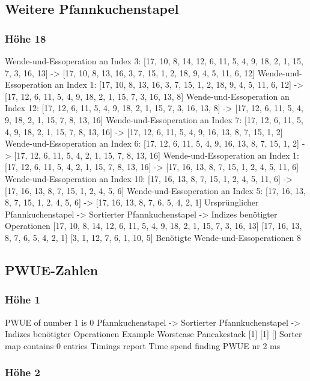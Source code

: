 {    \subsection{Weitere Pfannkuchenstapel}\label{sec:weitere-Pfannkuchenstapel}
    \subsubsection{Höhe 18}

    Wende-und-Essoperation an Index 3: [17, 10, 8, 14, 12, 6, 11, 5, 4, 9, 18, 2, 1, 15, 7, 3, 16, 13] -> [17, 10, 8, 13, 16, 3, 7, 15, 1, 2, 18, 9, 4, 5, 11, 6, 12]
    Wende-und-Essoperation an Index 1: [17, 10, 8, 13, 16, 3, 7, 15, 1, 2, 18, 9, 4, 5, 11, 6, 12] -> [17, 12, 6, 11, 5, 4, 9, 18, 2, 1, 15, 7, 3, 16, 13, 8]
    Wende-und-Essoperation an Index 12: [17, 12, 6, 11, 5, 4, 9, 18, 2, 1, 15, 7, 3, 16, 13, 8] -> [17, 12, 6, 11, 5, 4, 9, 18, 2, 1, 15, 7, 8, 13, 16]
    Wende-und-Essoperation an Index 7: [17, 12, 6, 11, 5, 4, 9, 18, 2, 1, 15, 7, 8, 13, 16] -> [17, 12, 6, 11, 5, 4, 9, 16, 13, 8, 7, 15, 1, 2]
    Wende-und-Essoperation an Index 6: [17, 12, 6, 11, 5, 4, 9, 16, 13, 8, 7, 15, 1, 2] -> [17, 12, 6, 11, 5, 4, 2, 1, 15, 7, 8, 13, 16]
    Wende-und-Essoperation an Index 1: [17, 12, 6, 11, 5, 4, 2, 1, 15, 7, 8, 13, 16] -> [17, 16, 13, 8, 7, 15, 1, 2, 4, 5, 11, 6]
    Wende-und-Essoperation an Index 10: [17, 16, 13, 8, 7, 15, 1, 2, 4, 5, 11, 6] -> [17, 16, 13, 8, 7, 15, 1, 2, 4, 5, 6]
    Wende-und-Essoperation an Index 5: [17, 16, 13, 8, 7, 15, 1, 2, 4, 5, 6] -> [17, 16, 13, 8, 7, 6, 5, 4, 2, 1]
    Ursprünglicher Pfannkuchenstapel -> Sortierter Pfannkuchenstapel -> Indizes benötigter Operationen
    [17, 10, 8, 14, 12, 6, 11, 5, 4, 9, 18, 2, 1, 15, 7, 3, 16, 13]
    [17, 16, 13, 8, 7, 6, 5, 4, 2, 1]
    [3, 1, 12, 7, 6, 1, 10, 5]
    Benötigte Wende-und-Essoperationen 8
    \subsection{PWUE-Zahlen}\label{sec:pwue-zahlen}
    \subsubsection{Höhe 1}

    PWUE of number 1 is 0
    Pfannkuchenstapel -> Sortierter Pfannkuchenstapel -> Indizes benötigter Operationen
Example Worstcase Pancakestack
    [1]
    [1]
    []
    Sorter map contains 0 entries
    Timings report
    Time spend finding PWUE nr 2 ms
    \subsubsection{Höhe 2}

}
